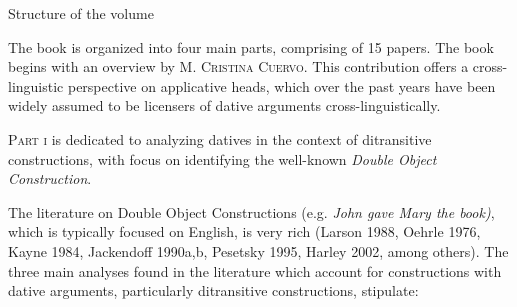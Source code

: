\begin{listWWviiiNumiileveli}
\item 
\begin{listWWviiiNumiilevelii}
\item 
\begin{stylelsSectionii}
Structure of the volume
\end{stylelsSectionii}
\end{listWWviiiNumiilevelii}
\end{listWWviiiNumiileveli}
\begin{styleBodyA}
The book is organized into four main parts, comprising of 15 papers. The book begins with an overview by M\textsc{. Cristina Cuervo}. This contribution offers a cross-linguistic perspective on applicative heads, which over the past years have been widely assumed to be licensers of dative arguments cross-linguistically.
\end{styleBodyA}

\begin{styleBodyA}
\textsc{Part i }is dedicated to analyzing datives in the context of ditransitive constructions, with focus on identifying the well-known \textit{Double Object Construction}. 
\end{styleBodyA}

\begin{styleBodyA}
The literature on Double Object Constructions (e.g. \textit{John gave Mary the book)}, which is typically focused on English, is very rich (Larson 1988, Oehrle 1976, Kayne 1984, Jackendoff 1990a,b, Pesetsky 1995, Harley 2002, among others). The three main analyses found in the literature which account for constructions with dative arguments, particularly ditransitive constructions, stipulate: 
\end{styleBodyA}


